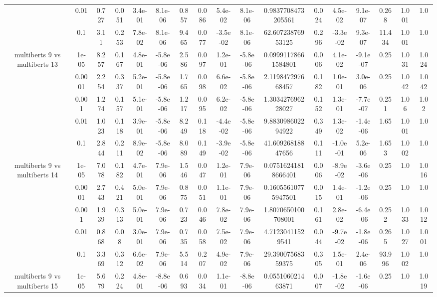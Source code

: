 \begin{tabular}{|c|c|c|c|c|c|c|c|c|c|c|c|c|c|c|c|c|}
 & 0.01 & 0.727 & 0.051 & 3.4e-01 & 8.1e-06 & 0.857 & 0.086 & 5.4e-02 & 8.1e-06 & 0.9837708473205561 & 0.024 & 4.5e-02 & 9.1e-07 & 0.268 & 1.001 & 1.0 \\
 & 0.1 & 3.11 & 0.253 & 7.8e-02 & 8.1e-06 & 9.465 & 0.077 & -3.5e-02 & 8.1e-06 & 62.60723876953125 & 0.296 & -3.3e-02 & 9.3e-07 & 11.434 & 1.001 & 1.0 \\
\hline
\multirow{5}{*}{multiberts 9 vs multiberts 13} & 1e-05 & 8.257 & 0.167 & 4.8e-01 & -5.8e-06 & 2.586 & 0.097 & 1.2e-01 & -5.8e-06 & 0.09991178661584801 & 0.006 & 4.1e-02 & -9.1e-07 & 0.25 & 1.031 & 1.024 \\
 & 0.0001 & 2.254 & 0.337 & 5.2e-01 & -5.8e-06 & 1.765 & 0.098 & 6.6e-02 & -5.8e-06 & 2.119847297668457 & 0.182 & 1.0e-01 & 3.0e-06 & 0.25 & 1.042 & 1.042 \\
 & 0.001 & 1.274 & 0.157 & 5.1e-01 & -5.8e-06 & 1.217 & 0.095 & 6.2e-02 & -5.8e-06 & 1.303427696228027 & 0.152 & 1.3e-01 & -7.7e-07 & 0.251 & 1.06 & 1.02 \\
 & 0.01 & 1.023 & 0.118 & 3.9e-01 & -5.8e-06 & 8.249 & 0.118 & -4.4e-02 & -5.8e-06 & 9.883098602294922 & 0.349 & 1.3e-02 & -1.4e-06 & 1.65 & 1.001 & 1.0 \\
 & 0.1 & 2.844 & 0.211 & 8.9e-02 & -5.8e-06 & 8.089 & 0.149 & -3.9e-02 & -5.8e-06 & 41.60926818847656 & 0.111 & -1.0e-01 & 5.2e-06 & 1.653 & 1.002 & 1.0 \\
\hline
\multirow{5}{*}{multiberts 9 vs multiberts 14} & 1e-05 & 7.078 & 0.182 & 4.7e-01 & 7.9e-06 & 1.546 & 0.047 & 1.2e-01 & 7.9e-06 & 0.07516241818666401 & 0.006 & -8.9e-02 & -3.6e-06 & 0.25 & 1.0 & 1.016 \\
 & 0.0001 & 2.743 & 0.421 & 5.0e-01 & 7.9e-06 & 0.875 & 0.051 & 1.1e-01 & 7.9e-06 & 0.16055610775947501 & 0.015 & 1.4e-01 & -1.2e-06 & 0.25 & 1.0 & 1.0 \\
 & 0.001 & 1.939 & 0.313 & 5.0e-01 & 7.9e-06 & 0.723 & 0.046 & 7.8e-02 & 7.9e-06 & 1.8070650100708001 & 0.161 & 2.8e-02 & -6.4e-06 & 0.252 & 1.033 & 1.012 \\
 & 0.01 & 0.868 & 0.08 & 3.0e-01 & 7.9e-06 & 0.735 & 0.058 & 7.5e-02 & 7.9e-06 & 4.71230411529541 & 0.044 & -9.7e-02 & -1.8e-06 & 0.265 & 1.027 & 1.001 \\
 & 0.1 & 3.369 & 0.312 & 6.6e-02 & 7.9e-06 & 5.514 & 0.207 & 4.9e-02 & 7.9e-06 & 29.39007568359375 & 0.305 & 1.5e-01 & 2.4e-06 & 93.996 & 1.002 & 1.0 \\
\hline
\multirow{5}{*}{multiberts 9 vs multiberts 15} & 1e-05 & 5.679 & 0.224 & 4.8e-01 & -8.8e-06 & 0.693 & 0.034 & 1.1e-01 & -8.8e-06 & 0.055106021463871 & 0.007 & -1.8e-02 & -1.6e-06 & 0.25 & 1.0 & 1.019 \\

\end{tabular}
